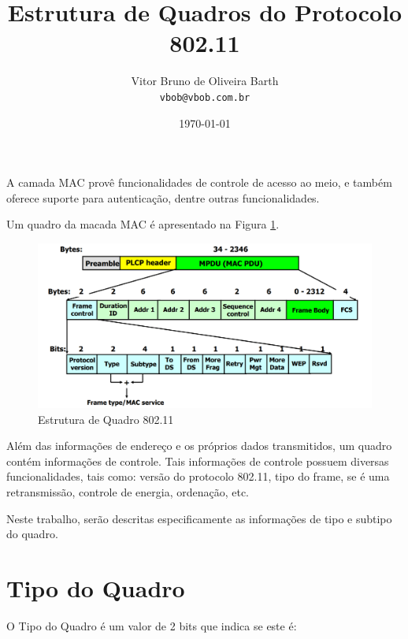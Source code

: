 \documentclass{article}
\title{Estrutura de Quadros do Protocolo 802.11} %
\author{Vitor Bruno de Oliveira Barth\\ \texttt{vbob@vbob.com.br}} %
\date{\today} %
\begin{document}
\maketitle %


\par A camada MAC provê funcionalidades de controle de acesso ao meio, e também oferece suporte para autenticação, dentre outras funcionalidades.
\par Um quadro da macada MAC é apresentado na Figura \ref{fig:frame-macro}.

\begin{figure}[h!]
  \includegraphics[width=\linewidth]{frame-macro.png}
  \caption{Estrutura de Quadro 802.11}
  \label{fig:frame-macro}
\end{figure}

\par Além das informações de endereço e os próprios dados transmitidos, um quadro contém informações de controle. Tais informações de controle possuem diversas funcionalidades, tais como: versão do protocolo 802.11, tipo do frame, se é uma retransmissão, controle de energia, ordenação, etc.
\par Neste trabalho, serão descritas especificamente as informações de tipo e subtipo do quadro.

\section*{Tipo do Quadro}

\par O Tipo do Quadro é um valor de 2 bits que indica se este é:
\end{document}
